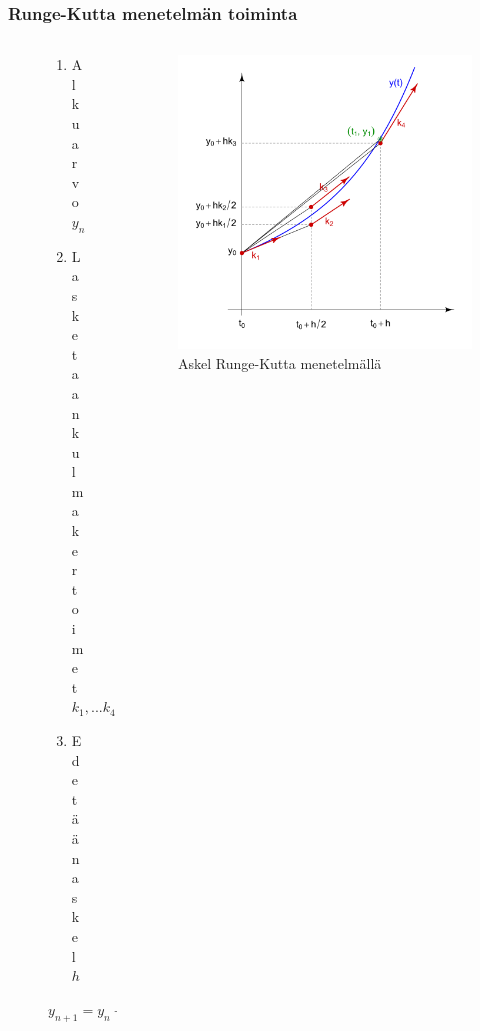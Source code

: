 \documentclass[finnish, 11pt, fleqn]{beamer}
\begin{document}
\begin{frame}
	\frametitle{Runge-Kutta menetelmän toiminta}
	\vspace{-2em}	
	\begin{columns}[onlytextwidth]
		\begin{column}{.35\textwidth}
			\begin{figure}
				\vspace{-2em}
    			\begin{enumerate}
    				\item{\small Alkuarvo $y_n$}
    				\vspace{1em}
    				\item{\small Lasketaan kulmakertoimet $k_1, ... k_4$}
					\vspace{1em}    				
    				\item{\small Edetään askel $h$}
    			\end{enumerate}
    			\hspace{0em} $y_{n+1} = y_n + h\,K$
			\end{figure}
		\end{column}
		\hfill
		\begin{column}{.65\textwidth}
			\begin{figure}[h!]
				\vspace{-1em}
				\includegraphics[scale=0.22]{graphics/Runge-Kutta_slopes.png}
				\vspace{-2.5em}				
				{\caption{Askel Runge-Kutta menetelmällä}}
			\end{figure}
		\end{column}
	\end{columns}	
\end{frame}
\end{document}
